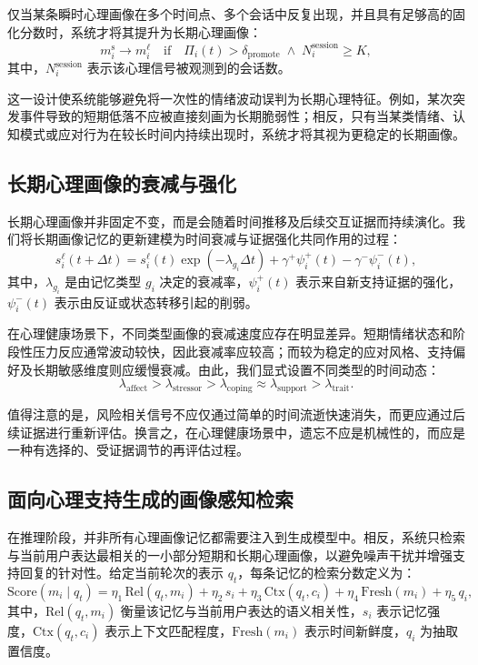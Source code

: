 \documentclass[12pt,a4paper]{article}
\begin{document}
仅当某条瞬时心理画像在多个时间点、多个会话中反复出现，并且具有足够高的固化分数时，系统才将其提升为长期心理画像：
\begin{equation}
m^{\text{s}}_i \rightarrow m^{\ell}_i \quad \text{if} \quad \Pi_i(t) > \delta_{\text{promote}} \;\wedge\; N^{\text{session}}_i \geq K,
\label{eq:promote}
\end{equation}
其中，$N^{\text{session}}_i$ 表示该心理信号被观测到的会话数。

这一设计使系统能够避免将一次性的情绪波动误判为长期心理特征。例如，某次突发事件导致的短期低落不应被直接刻画为长期脆弱性；相反，只有当某类情绪、认知模式或应对行为在较长时间内持续出现时，系统才将其视为更稳定的长期画像。

\subsection{长期心理画像的衰减与强化}

长期心理画像并非固定不变，而是会随着时间推移及后续交互证据而持续演化。我们将长期画像记忆的更新建模为时间衰减与证据强化共同作用的过程：
\begin{equation}
s^{\ell}_i(t + \Delta t) = s^{\ell}_i(t) \exp(-\lambda_{g_i} \Delta t) + \gamma^+ \psi^+_i(t) - \gamma^- \psi^-_i(t),
\label{eq:decay}
\end{equation}
其中，$\lambda_{g_i}$ 是由记忆类型 $g_i$ 决定的衰减率，$\psi^+_i(t)$ 表示来自新支持证据的强化，$\psi^-_i(t)$ 表示由反证或状态转移引起的削弱。

在心理健康场景下，不同类型画像的衰减速度应存在明显差异。短期情绪状态和阶段性压力反应通常波动较快，因此衰减率应较高；而较为稳定的应对风格、支持偏好及长期敏感维度则应缓慢衰减。由此，我们显式设置不同类型的时间动态：
\begin{equation}
\lambda_{\text{affect}} > \lambda_{\text{stressor}} > \lambda_{\text{coping}} \approx \lambda_{\text{support}} > \lambda_{\text{trait}}.
\label{eq:decay_rates}
\end{equation}

值得注意的是，风险相关信号不应仅通过简单的时间流逝快速消失，而更应通过后续证据进行重新评估。换言之，在心理健康场景中，遗忘不应是机械性的，而应是一种有选择的、受证据调节的再评估过程。

\subsection{面向心理支持生成的画像感知检索}

在推理阶段，并非所有心理画像记忆都需要注入到生成模型中。相反，系统只检索与当前用户表达最相关的一小部分短期和长期心理画像，以避免噪声干扰并增强支持回复的针对性。给定当前轮次的表示 $q_t$，每条记忆的检索分数定义为：
\begin{equation}
\text{Score}(m_i \mid q_t) = \eta_1\,\text{Rel}(q_t, m_i) + \eta_2\,s_i + \eta_3\,\text{Ctx}(q_t, c_i) + \eta_4\,\text{Fresh}(m_i) + \eta_5\,q_i,
\label{eq:retrieval}
\end{equation}
其中，$\text{Rel}(q_t, m_i)$ 衡量该记忆与当前用户表达的语义相关性，$s_i$ 表示记忆强度，$\text{Ctx}(q_t, c_i)$ 表示上下文匹配程度，$\text{Fresh}(m_i)$ 表示时间新鲜度，$q_i$ 为抽取置信度。
\end{document}
